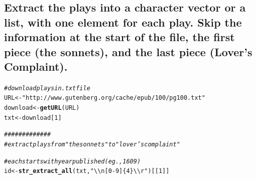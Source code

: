 \documentclass{article}\usepackage[]{graphicx}\usepackage[]{color}
\makeatletter
\newcommand{\hlnum}[1]{\textcolor[rgb]{0.686,0.059,0.569}{#1}}%
\newcommand{\hlstr}[1]{\textcolor[rgb]{0.192,0.494,0.8}{#1}}%
\newcommand{\hlcom}[1]{\textcolor[rgb]{0.678,0.584,0.686}{\textit{#1}}}%
\newcommand{\hlstd}[1]{\textcolor[rgb]{0.345,0.345,0.345}{#1}}%
\newcommand{\hlkwb}[1]{\textcolor[rgb]{0.69,0.353,0.396}{#1}}%
\newcommand{\hlkwd}[1]{\textcolor[rgb]{0.737,0.353,0.396}{\textbf{#1}}}%
\newenvironment{kframe}{%
 \def\at@end@of@kframe{}%
 \ifinner\ifhmode%
  \def\at@end@of@kframe{\end{minipage}}%
  \begin{minipage}{\columnwidth}%
 \fi\fi%
 \def\FrameCommand##1{\hskip\@totalleftmargin \hskip-\fboxsep
 \colorbox{shadecolor}{##1}\hskip-\fboxsep
     \hskip-\linewidth \hskip-\@totalleftmargin \hskip\columnwidth}%
 \MakeFramed {\advance\hsize-\width
   \@totalleftmargin\z@ \linewidth\hsize
   \@setminipage}}%
 {\par\unskip\endMakeFramed%
 \at@end@of@kframe}
\newenvironment{knitrout}{}{} %
\makeatother
\begin{document}
\subsection{Extract the plays into a character vector or a list, with one element for each play. Skip the information at the start of the file, the first piece (the sonnets), and the last piece (Lover's Complaint).} %


\begin{knitrout}
\color{fgcolor}\begin{kframe}
\begin{alltt}
\hlcom{#download plays in .txt file}
\hlstd{URL}   \hlkwb{<-} \hlstr{"http://www.gutenberg.org/cache/epub/100/pg100.txt"}
\hlstd{download} \hlkwb{<-} \hlkwd{getURL}\hlstd{(URL)}
\hlstd{txt} \hlkwb{<-} \hlstd{download[}\hlnum{1}\hlstd{]}

\hlcom{#############}
\hlcom{#extract plays from "the sonnets" to "lover's complaint"}

\hlcom{#each starts with year published (eg., 1609)}
\hlstd{id} \hlkwb{<-} \hlkwd{str_extract_all}\hlstd{(txt,} \hlstr{"\textbackslash{}\textbackslash{}n[0-9]\{4\}\textbackslash{}\textbackslash{}r"}\hlstd{)[[}\hlnum{1}\hlstd{]]}


\end{alltt}
\end{kframe}
\end{knitrout}
\end{document}
